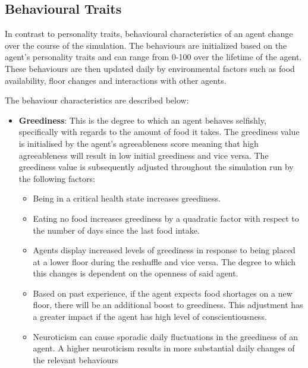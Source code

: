 \subsection{Behavioural Traits}
\label{subsec: Behaviour}

In contrast to personality traits, behavioural characteristics of an agent change over the course of the simulation. The behaviours are initialized based on the agent's personality traits and can range from 0-100 over the lifetime of the agent. These behaviours are then updated daily by environmental factors such as food availability, floor changes and interactions with other agents. 

The behaviour characteristics are described below:
\begin{itemize}
    \item  \textbf{Greediness}: This is the degree to which an agent behaves selfishly, specifically with regards to the amount of food it takes. The greediness value is initialised by the agent's agreeableness score meaning that high agreeableness will result in low initial greediness and vice versa. The greediness value is subsequently adjusted throughout the simulation run by the following factors: 
    
    \begin{itemize}
        \item Being in a critical health state increases greediness.
        \item Eating no food increases greediness by a quadratic factor with respect to the number of days since the last food intake.
        \item Agents display increased levels of greediness in response to being placed at a lower floor during the reshuffle and vice versa. The degree to which this changes is dependent on the openness of said agent.  
        \item Based on past experience, if the agent expects food shortages on a new floor, there will be an additional boost to greediness. This adjustment has a greater impact if the agent has high level of conscientiousness.
        \item Neuroticism can cause sporadic daily fluctuations in the greediness of an agent. A higher neuroticism results in more substantial daily changes of the relevant behaviours 
    \end{itemize}
    

\end{itemize}
